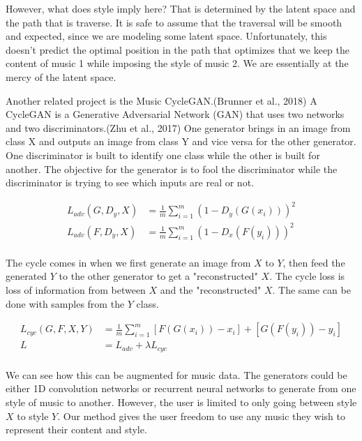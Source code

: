 \documentclass{article}
\begin{document}
However, what does style imply here? That is determined by the latent space and the path that is traverse. It is safe to assume that the traversal will be smooth and expected, since we are modeling some latent space. Unfortunately, this doesn't predict the optimal position in the path that optimizes that we keep the content of music 1 while imposing the style of music 2. We are essentially at the mercy of the latent space.

Another related project is the Music CycleGAN.(Brunner et al., 2018) A CycleGAN is a Generative Adversarial Network (GAN) that uses two networks and two discriminators.(Zhu et al., 2017) One generator brings in an image from class X and outputs an image from class Y and vice versa for the other generator. One discriminator is built to identify one class while the other is built for another. The objective for the generator is to fool the discriminator while the discriminator is trying to see which inputs are real or not. 

\begin{equation} 
\begin{split}
L_{adv}(G, D_y, X) & = \frac{1}{m} \sum_{i=1}^{m} (1 - D_y(G(x_i)))^2 \\
L_{adv}(F, D_y, X) & = \frac{1}{m} \sum_{i=1}^{m} (1 - D_x(F(y_i)))^2 \\
\end{split} 
\end{equation}

The cycle comes in when we first generate an image from $X$ to $Y$, then feed the generated $Y$ to the other generator to get a "reconstructed" $X$. The cycle loss is loss of information from between $X$ and the "reconstructed" $X$. The same can be done with samples from the $Y$ class. 

\begin{equation} 
\begin{split}
L_{cyc}(G, F, X, Y) & =  \frac{1}{m} \sum_{i=1}^{m} \left[ F(G(x_i)) - x_i \right] + \left[ G(F(y_i)) - y_i \right] \\
L & = L_{adv} + \lambda L_{cyc} \\
\end{split} 
\end{equation}

We can see how this can be augmented for music data. The generators could be either 1D convolution networks or recurrent neural networks to generate from one style of music to another. However, the user is limited to only going between style $X$ to style $Y$. Our method gives the user freedom to use any music they wish to represent their content and style. 
\end{document}
